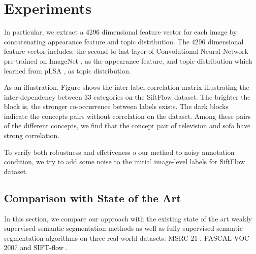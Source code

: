 \section{Experiments}
In particular, we extract a 4296 dimensional feature vector for each image by concatenating appearance feature and topic distribution. The 4296 dimensional feature vector includes: the second to last layer of Convolutional Neural Network\cite{simonyan2014very} pre-trained on ImageNet \cite{deng2009imagenet}, as the appearance feature, and topic distribution which learned from pLSA \cite{hofmann1999probabilistic}, as topic distribution.

As an illustration, Figure shows the inter-label correlation matrix illustrating the inter-dependency between 33 categories on the SiftFlow dataset. The brighter the block is, the stronger co-occurrence between labels exists. The dark blocks indicate the concepts pairs without correlation on the dataset. 
Among these pairs of the different concepts, we find that the concept pair of television and sofa have strong correlation.

To verify both robustness and effctiveness o our method to noisy annotation condition, we try to add some noise to the initial image-level labels for SiftFlow dataset.


\subsection{Comparison with State of the Art}
In this section, we compare our approach with the existing state of the art weakly supervised semantic segmentation methods as well as fully supervised semantic segmentation algorithms on three real-world datasets: MSRC-21 \cite{shotton2006textonboost}, PASCAL VOC 2007 \cite{pascal-voc-2007} and SIFT-flow \cite{liu2011nonparametric}. 

